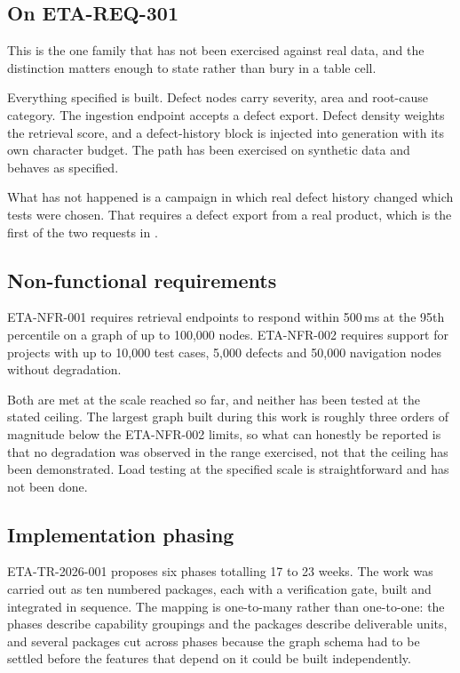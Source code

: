 \subsection{On ETA-REQ-301}

This is the one family that has not been exercised against real data, and the
distinction matters enough to state rather than bury in a table cell.

Everything specified is built. Defect nodes carry severity, area and
root-cause category. The ingestion endpoint accepts a defect export. Defect
density weights the retrieval score, and a defect-history block is injected
into generation with its own character budget. The path has been exercised on
synthetic data and behaves as specified.

What has not happened is a campaign in which real defect history changed which
tests were chosen. That requires a defect export from a real product, which is
the first of the two requests in .

\subsection{Non-functional requirements}

ETA-NFR-001 requires retrieval endpoints to respond within 500\,ms at the 95th
percentile on a graph of up to 100{,}000 nodes. ETA-NFR-002 requires support for
projects with up to 10{,}000 test cases, 5{,}000 defects and 50{,}000 navigation
nodes without degradation.

Both are met at the scale reached so far, and neither has been tested at the
stated ceiling. The largest graph built during this work is roughly three
orders of magnitude below the ETA-NFR-002 limits, so what can honestly be
reported is that no degradation was observed in the range exercised, not that
the ceiling has been demonstrated. Load testing at the specified scale is
straightforward and has not been done.

\subsection{Implementation phasing}

ETA-TR-2026-001 proposes six phases totalling 17 to 23 weeks. The work was
carried out as ten numbered packages, each with a verification gate, built and
integrated in sequence. The mapping is
one-to-many rather than one-to-one: the phases describe capability groupings
and the packages describe deliverable units, and several packages cut across
phases because the graph schema had to be settled before the features that
depend on it could be built independently.
